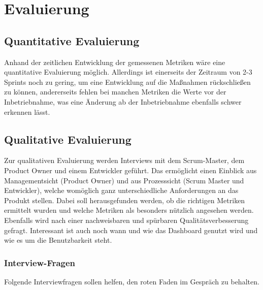 \chapter{Evaluierung}

\section{Quantitative Evaluierung}

Anhand der zeitlichen Entwicklung der gemessenen Metriken wäre eine quantitative Evaluierung möglich.
Allerdings ist einerseits der Zeitraum von 2-3 Sprints noch zu gering, um eine Entwicklung auf die Maßnahmen rückschließen zu können,
andererseits fehlen bei manchen Metriken die Werte vor der Inbetriebnahme, was eine Änderung ab der Inbetriebnahme ebenfalls schwer erkennen lässt.

\clearpage
\section{Qualitative Evaluierung}

Zur qualitativen Evaluierung werden Interviews mit dem Scrum-Master, dem Product Owner und einem Entwickler geführt.
Das ermöglicht einen Einblick aus Managementsicht (Product Owner) und aus Prozesssicht (Scrum Master und Entwickler), welche womöglich ganz unterschiedliche Anforderungen an das Produkt stellen.
Dabei soll herausgefunden werden, ob die richtigen Metriken ermittelt wurden und welche Metriken als besonders nützlich angesehen werden.
Ebenfalls wird nach einer nachweisbaren und spürbaren Qualitätsverbesserung gefragt.
Interessant ist auch noch wann und wie das Dashboard genutzt wird und wie es um die Benutzbarkeit steht.

\subsection{Interview-Fragen}

Folgende Interviewfragen sollen helfen, den roten Faden im Gespräch zu behalten.

